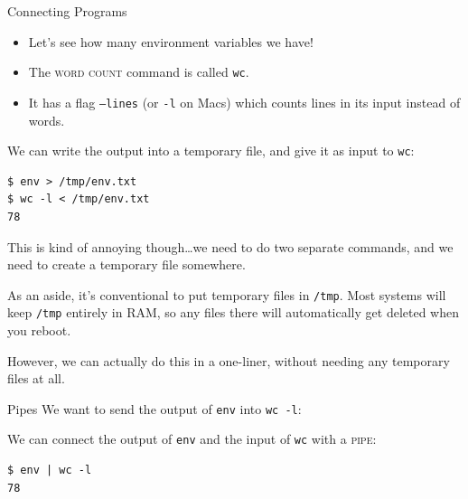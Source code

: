 \begin{frame}[fragile]{Connecting Programs}
  \begin{itemize}
    \item
      Let's see how many environment variables we have!
      \pause
    \item
      \alert<2>{The \textsc{word count} command is called \texttt{wc}.}
      \pause
    \item
      It has a flag \texttt{--lines} (or \texttt{-l} on Macs) which counts
      lines in its input instead of words.
      \pause
  \end{itemize}
  \begin{example}
    We can write the output into a temporary file, and give it as input to
    \texttt{wc}:
  \begin{verbatim}
$ env > /tmp/env.txt
$ wc -l < /tmp/env.txt
78
  \end{verbatim}
  \end{example}
\end{frame}

This is kind of annoying though\ldots we need to do two separate commands, and
we need to create a temporary file somewhere.

As an aside, it's conventional to put temporary files in \texttt{/tmp}. Most
systems will keep \texttt{/tmp} entirely in RAM, so any files there will
automatically get deleted when you reboot.

However, we can actually do this in a one-liner, without needing any temporary
files at all.

\begin{frame}[fragile]{Pipes}
  We want to send the output of \texttt{env} into \texttt{wc -l}:

  \begin{example}
    We can connect the output of \texttt{env} and the input of \texttt{wc} with
    a \textsc{pipe}:
  \begin{verbatim}
$ env | wc -l
78
  \end{verbatim}
  \end{example}
\end{frame}

